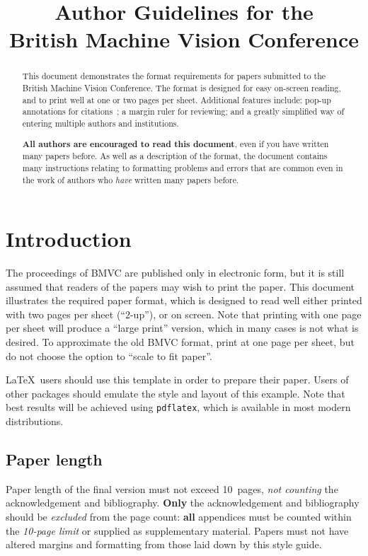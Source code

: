 \documentclass{bmvc2k}
\title{Author Guidelines for the\\ British Machine Vision Conference}
\begin{document}
\maketitle

\begin{abstract}
This document demonstrates the format requirements for papers submitted
to the British Machine Vision Conference.  The format is designed for
easy on-screen reading, and to print well at one or two pages per sheet.
Additional features include: pop-up annotations for
citations~\cite{Authors06,Mermin89}; a margin ruler for reviewing; and a
greatly simplified way of entering multiple authors and institutions.

{\bf All authors are encouraged to read this document}, even if you have
written many papers before.  As well as a description of the format, the
document contains many instructions relating to formatting problems and
errors that are common even in the work of authors who {\em have}
written many papers before.
\end{abstract}

\section{Introduction}
\label{sec:intro}
The proceedings of BMVC are published only in electronic form, but it is still assumed
that readers of the papers may wish to print the paper.   This document
illustrates the required paper format, which is designed to read well either printed
with two pages per sheet (``2-up''), or on screen.  Note that printing with one page
per sheet will produce a ``large print'' version, which in many cases is not what is desired.
To approximate the old BMVC format, print at one page per sheet, but do not choose
the option to ``scale to fit paper''.

\LaTeX\ users should use this template in order to prepare their paper.
Users of other packages should emulate the style and layout of this
example.  Note that best results will be achieved using {\tt pdflatex},
which is available in most modern distributions.

\subsection{Paper length}
Paper length of the final version must not exceed 10~pages, {\em not counting} the acknowledgement and bibliography.
{\bf Only}  the acknowledgement and bibliography should be {\em excluded} from the page count: {\bf all} appendices must be counted within the {\em 10-page limit} or supplied as supplementary material. Papers must not have altered margins and formatting from those laid down by this style guide.
\end{document}
